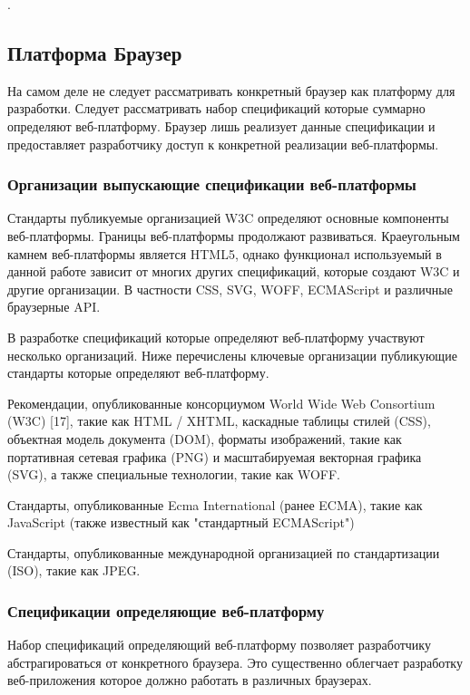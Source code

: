 .


\newpage

\subsection{Платформа Браузер}
На самом деле не следует рассматривать конкретный браузер как платформу для разработки. Следует рассматривать набор спецификаций которые суммарно определяют веб-платформу. Браузер лишь реализует данные спецификации и предоставляет разработчику доступ к конкретной реализации веб-платформы.

\subsubsection{ Организации выпускающие спецификации веб-платформы}
Стандарты публикуемые организацией W3C определяют основные компоненты веб-платформы. Границы веб-платформы продолжают развиваться. Краеугольным камнем веб-платформы является HTML5, однако функционал используемый в данной работе зависит от многих других спецификаций, которые создают W3C и другие организации. В частности CSS, SVG, WOFF, ECMAScript и различные браузерные API.

В разработке спецификаций которые определяют веб-платформу участвуют несколько организаций. Ниже перечислены ключевые организации публикующие стандарты которые определяют веб-платформу.

\begin{my_enumerate}
\item Рекомендации, опубликованные консорциумом World Wide Web Consortium (W3C) [17], такие как HTML / XHTML, каскадные таблицы стилей (CSS), объектная модель документа (DOM), форматы изображений, такие как портативная сетевая графика (PNG) и масштабируемая векторная графика (SVG), а также специальные технологии, такие как WOFF.
\item Стандарты, опубликованные Ecma International (ранее ECMA), такие как JavaScript (также известный как "стандартный ECMAScript")
\item Стандарты, опубликованные международной организацией по стандартизации (ISO), такие как JPEG.
\end{my_enumerate}


\subsubsection{ Спецификации определяющие веб-платформу}
Набор спецификаций определяющий веб-платформу позволяет разработчику абстрагироваться от конкретного браузера. Это существенно облегчает разработку веб-приложения которое должно работать в различных браузерах.

